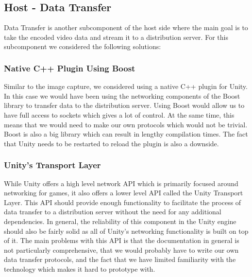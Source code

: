 
\subsection{Host - Data Transfer} %
Data Transfer is another subcomponent of the host side where the main goal is to take the encoded video data and stream it to a distribution server. For this subcomponent we considered the following solutions:

\subsubsection{Native C++ Plugin Using Boost}
Similar to the image capture, we considered using a native C++ plugin for Unity. In this case we would have been using the networking components of the Boost library\cite{boost} to transfer data to the distribution server. Using Boost would allow us to have full access to sockets which gives a lot of control. At the same time, this means that we would need to make our own protocols which would not be trivial. Boost is also a big library which can result in lengthy compilation times. The fact that Unity needs to be restarted to reload the plugin is also a downside. 

\subsubsection{Unity's Transport Layer}
While Unity offers a high level network API which is primarily focused around networking for games, it also offers a lower level API called the Unity Transport Layer\cite{unity_transportLayer}. This API should provide enough functionality to facilitate the process of data transfer to a distribution server without the need for any additional dependencies. In general, the reliability of this component in the Unity engine should also be fairly solid as all of Unity's networking functionality is built on top of it. The main problems with this API is that the documentation in general is not particularly comprehensive, that we would probably have to write our own data transfer protocols, and the fact that we have limited familiarity with the technology which makes it hard to prototype with. 

